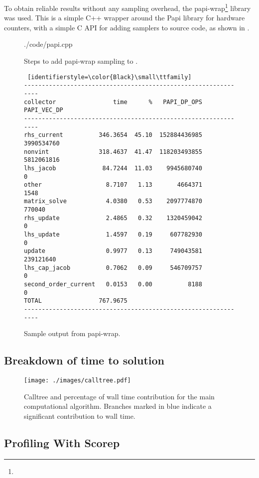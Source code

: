 To obtain reliable results without any sampling overhead, the papi-wrap\footnote{} library was used. This is a simple C++ wrapper around the Papi library for hardware counters, with a simple C API for adding samplers to source code, as shown in .

\begin{figure}[htp!]
\begin{shaded}
 {./code/papi.cpp}
\end{shaded}
\caption{Steps to add papi-wrap sampling to \neuron.}
\label{fig:papiinline}
\end{figure}

\begin{figure}[htp!]
\begin{lstlisting} [identifierstyle=\color{Black}\small\ttfamily]
---------------------------------------------------------------
collector                time      %   PAPI_DP_OPS PAPI_VEC_DP
---------------------------------------------------------------
rhs_current          346.3654  45.10  152884436985  3990534760
nonvint              318.4637  41.47  118203493855  5812061816
lhs_jacob             84.7244  11.03    9945680740           0
other                  8.7107   1.13       4664371        1548
matrix_solve           4.0380   0.53    2097774870      770040
rhs_update             2.4865   0.32    1320459042           0
lhs_update             1.4597   0.19     607782930           0
update                 0.9977   0.13     749043581   239121640
lhs_cap_jacob          0.7062   0.09     546709757           0
second_order_current   0.0153   0.00          8188           0
TOTAL                767.9675
---------------------------------------------------------------
\end{lstlisting}
\caption{Sample output from papi-wrap.}
\label{fig:papisample}
\end{figure}

\subsection{Breakdown of time to solution}
\begin{figure}[htp!]
\centering
\texttt{[image: ./images/calltree.pdf]}
\caption{Calltree and percentage of wall time contribution for the main computational algorithm. Branches marked in blue indicate a significant contribution to wall time.}
\label{fig:calltree}
\end{figure}


\subsection{Profiling With Scorep}
\label{sec:scorep}


